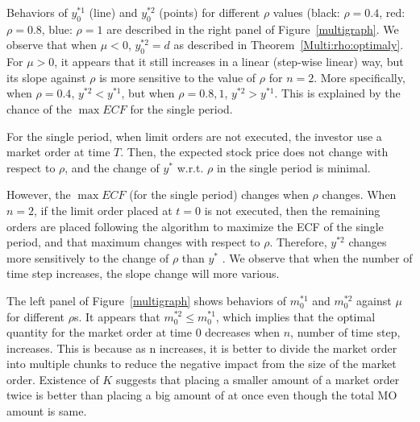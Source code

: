 \documentclass[11pt]{article}
\theoremstyle{plain}
\numberwithin{equation}{section}
\begin{document}
{

Behaviors of $y_0^{*1}$ (line) and $y_0^{*2}$ (points) for different $\rho$ values (black: $\rho=0.4$, red: $\rho=0.8$, blue: $\rho=1$ are described in  the right panel of Figure~\ref{multigraph}. We observe that when $\mu<0$, $y_0^{*2}=d$ as described in Theorem~\ref{Multi:rho:optimaly}. 
 For $\mu>0$, it appears that it still increases in a linear (step-wise linear) way, but its slope against $\rho$ is more sensitive to the value of $\rho$ for $n=2$. More specifically, when $\rho=0.4$, $y^{*2}<y^{*1}$, but when $\rho=0.8, 1$, $y^{*2}>y^{*1}$. This is explained by the chance of the $\max ECF$ for the single period. 

For the single period, when limit orders are not executed, the investor use a market order at time $T$. Then, the expected stock price does not change with respect to $\rho$, and the change of $y^*$ w.r.t. $\rho$ in the single period is minimal. 

However,  the $\max ECF$ (for the single period) changes when $\rho$ changes. 
When $n=2$, if the limit order placed at $t=0$ is not executed, then the remaining orders are placed following the algorithm to maximize the ECF of the single period, and that maximum changes with respect to $\rho$. Therefore,  $y^{*2}$ changes more sensitively to the change of $\rho$ than $y^*$ . We observe that when the number of time step increases, the slope change will more various.


The left panel of Figure~\ref{multigraph} shows behaviors of $m_0^{*1}$ and $m_0^{*2}$ against $\mu$ for different $\rho$s. 
It appears that $m_0^{*2}\leq m_0^{*1}$, which implies that the optimal quantity for the market order at time $0$ decreases when $n$, number of time step, increases. This is because as n increases, it is better to divide the market order into multiple chunks to reduce the negative impact from the size of the market order. Existence of $K$ suggests that placing a  smaller amount of a market order twice is better than placing a big amount of at once even though the total MO amount is same. 



}
\end{document}
